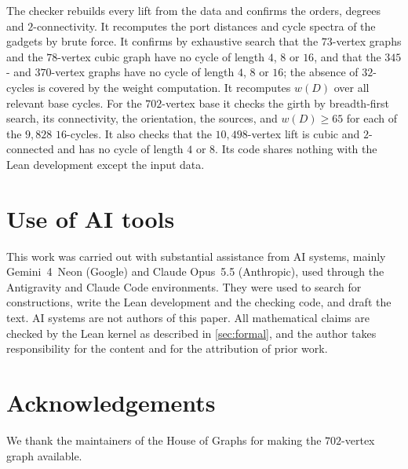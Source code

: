 \documentclass[11pt]{amsart}
\theoremstyle{definition}
\theoremstyle{remark}
\begin{document}
The checker rebuilds every lift from the data and confirms the orders, degrees
and $2$-connectivity. It recomputes the port distances and cycle spectra of the
gadgets by brute force. It confirms by exhaustive search that the
$73$-vertex graphs and the $78$-vertex cubic graph have no cycle of length
$4$, $8$ or $16$, and that the $345$- and $370$-vertex graphs have no cycle of
length $4$, $8$ or $16$; the absence of $32$-cycles is covered by the weight
computation. It recomputes $w(D)$ over all relevant base cycles. For
the $702$-vertex base it checks the girth by breadth-first search, its
connectivity, the orientation, the sources, and $w(D)\ge 65$ for each of the
$9{,}828$ $16$-cycles. It also checks that the $10{,}498$-vertex lift is
cubic and $2$-connected and has no cycle of length $4$ or $8$. Its code shares
nothing with the Lean development except the input data.

\section*{Use of AI tools}
This work was carried out with substantial assistance from AI systems, mainly
Gemini~4~Neon (Google) and Claude Opus~5.5 (Anthropic), used through the
Antigravity and Claude Code environments. They were used to search for
constructions, write the Lean development and the checking code, and draft the
text. AI systems are not authors of this paper. All mathematical claims are
checked by the Lean kernel as described in \cref{sec:formal}, and the author
takes responsibility for the content and for the attribution of prior work.

\section*{Acknowledgements}
We thank the maintainers of the House of Graphs for making the $702$-vertex
graph available.
\end{document}
